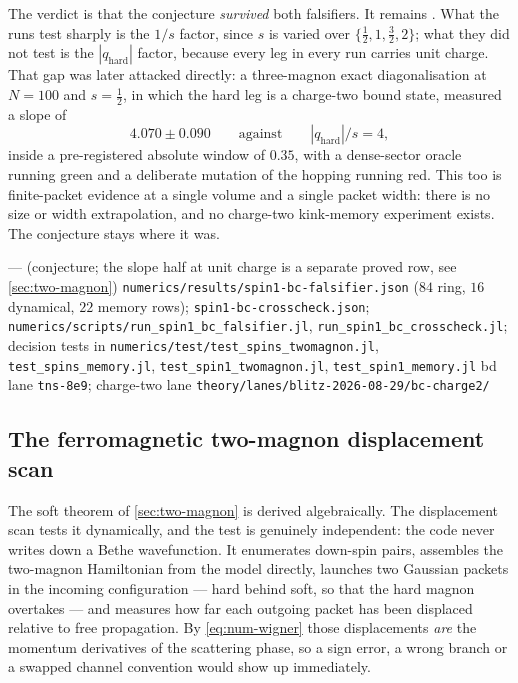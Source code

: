 The verdict is that the conjecture \emph{survived} both falsifiers. It remains
\statusConjecture. What the runs test sharply is the $1/s$ factor, since $s$
is varied over $\{\tfrac12,1,\tfrac32,2\}$; what they did not test is the
$|q_{\text{hard}}|$ factor, because every leg in every run carries unit
charge. That gap was later attacked directly: a three-magnon exact
diagonalisation at $N=100$ and $s=\tfrac12$, in which the hard leg is a
charge-two bound state, measured a slope of
\begin{equation}
  4.070 \pm 0.090 \qquad\text{against}\qquad |q_{\text{hard}}|/s = 4 ,
  \label{eq:num-charge2}
\end{equation}
inside a pre-registered absolute window of $0.35$, with a dense-sector oracle
running green and a deliberate mutation of the hopping running red. This too
is finite-packet evidence at a single volume and a single packet width: there
is no size or width extrapolation, and no charge-two kink-memory experiment
exists. The conjecture stays where it was.

{--- (conjecture; the slope half at unit charge is a separate proved row, see
 \cref{sec:two-magnon})}
{\texttt{numerics/\allowbreak{}results/\allowbreak{}spin1-\allowbreak{}bc-\allowbreak{}falsifier.json} ($84$ ring, $16$ dynamical,
 $22$ memory rows); \texttt{spin1-\allowbreak{}bc-\allowbreak{}crosscheck.json};
 \texttt{numerics/\allowbreak{}scripts/\allowbreak{}run\_\allowbreak{}spin1\_\allowbreak{}bc\_\allowbreak{}falsifier.jl},
 \texttt{run\_\allowbreak{}spin1\_\allowbreak{}bc\_\allowbreak{}crosscheck.jl}; decision tests in
 \texttt{numerics/\allowbreak{}test/\allowbreak{}test\_\allowbreak{}spins\_\allowbreak{}twomagnon.jl},
 \texttt{test\_\allowbreak{}spins\_\allowbreak{}memory.jl}, \texttt{test\_\allowbreak{}spin1\_\allowbreak{}twomagnon.jl},
 \texttt{test\_\allowbreak{}spin1\_\allowbreak{}memory.jl}}
{bd lane \texttt{tns-8e9}; charge-two lane
 \texttt{theory/\allowbreak{}lanes/\allowbreak{}blitz-\allowbreak{}2026-\allowbreak{}08-\allowbreak{}29/\allowbreak{}bc-\allowbreak{}charge2/\allowbreak{}}}

\subsection{The ferromagnetic two-magnon displacement scan}\label{sec:numerics-fm}

The soft theorem of \cref{sec:two-magnon} is derived algebraically. The
displacement scan tests it dynamically, and the test is genuinely independent:
the code never writes down a Bethe wavefunction. It enumerates down-spin
pairs, assembles the two-magnon Hamiltonian from the model directly, launches
two Gaussian packets in the incoming configuration --- hard behind soft, so
that the hard magnon overtakes --- and measures how far each outgoing packet
has been displaced relative to free propagation. By \cref{eq:num-wigner} those
displacements \emph{are} the momentum derivatives of the scattering phase, so
a sign error, a wrong branch or a swapped channel convention would show up
immediately.

